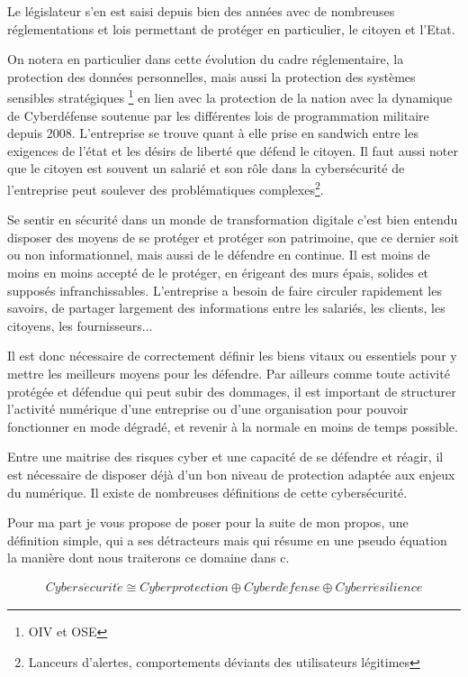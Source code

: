 Le législateur s'en est saisi depuis bien des années avec de nombreuses réglementations et lois permettant de protéger en particulier, le citoyen et l'Etat.

On notera en particulier dans cette évolution du cadre réglementaire,  la protection des données personnelles, mais aussi la protection des systèmes sensibles stratégiques \footnote{\gls{OIV}  et \gls{OSE} } en lien avec la protection de la nation avec la dynamique de Cyberdéfense soutenue par les différentes lois de programmation militaire depuis 2008. L'entreprise se trouve quant à elle prise en sandwich entre les exigences de l'état et les désirs de liberté que défend le citoyen. Il faut aussi noter que le citoyen est souvent un salarié et son rôle dans la cybersécurité de l'entreprise peut soulever des problématiques complexes\footnote{Lanceurs d'alertes, comportements déviants des utilisateurs légitimes}.
 
Se sentir en sécurité dans un monde de transformation digitale c'est bien entendu disposer des moyens de se protéger et protéger son patrimoine, que ce dernier soit ou non informationnel, mais aussi de le défendre en continue. Il est moins de moins en moins accepté de le protéger, en érigeant des murs épais, solides et supposés infranchissables. L'entreprise a besoin de faire circuler rapidement les savoirs, de partager largement des informations entre les salariés, les clients, les citoyens, les fournisseurs...


Il est donc nécessaire de correctement définir les biens vitaux ou essentiels pour y mettre les meilleurs moyens pour les défendre. Par ailleurs comme toute activité protégée et défendue qui peut subir des dommages, il est important de structurer l'activité numérique d'une entreprise ou d'une organisation pour pouvoir fonctionner en mode dégradé, et revenir à la normale en moins de temps possible.


Entre une maitrise des risques cyber et une capacité de se défendre et réagir, il est nécessaire de disposer déjà d'un bon niveau de protection adaptée aux enjeux du numérique. Il existe de nombreuses définitions de cette cybersécurité.

Pour ma part je vous propose de poser pour la suite de mon propos, une définition simple, qui a ses détracteurs mais qui résume en une pseudo équation la manière dont nous traiterons ce domaine dans c\ecours. \\
\begin{nota}
\begin{align}
Cybers\acute{e}curit\acute{e} \cong Cyberprotection\oplus Cyberd\acute{e}fense \oplus Cyberr\acute{e}silience
\end{align}
\end{nota}



